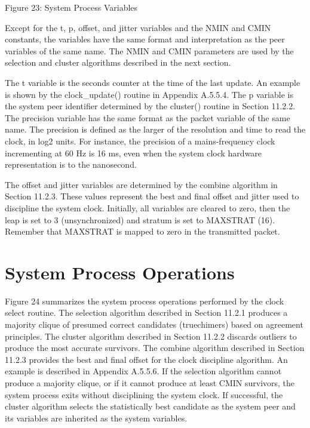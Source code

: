                 Figure 23: System Process Variables

Except for the t, p, offset, and jitter variables and the NMIN and
CMIN constants, the variables have the same format and interpretation
as the peer variables of the same name.  The NMIN and CMIN parameters
are used by the selection and cluster algorithms described in the
next section.

The t variable is the seconds counter at the time of the last update.
An example is shown by the clock_update() routine in
Appendix A.5.5.4.  The p variable is the system peer identifier
determined by the cluster() routine in Section 11.2.2.  The precision
variable has the same format as the packet variable of the same name.
The precision is defined as the larger of the resolution and time to
read the clock, in log2 units.  For instance, the precision of a
mains-frequency clock incrementing at 60 Hz is 16 ms, even when the
system clock hardware representation is to the nanosecond.

The offset and jitter variables are determined by the combine
algorithm in Section 11.2.3.  These values represent the best and
final offset and jitter used to discipline the system clock.
Initially, all variables are cleared to zero, then the leap is set to
3 (unsynchronized) and stratum is set to MAXSTRAT (16).  Remember
that MAXSTRAT is mapped to zero in the transmitted packet.

\section{System Process Operations}

Figure 24 summarizes the system process operations performed by the
clock select routine.  The selection algorithm described in
Section 11.2.1 produces a majority clique of presumed correct
candidates (truechimers) based on agreement principles.  The cluster
algorithm described in Section 11.2.2 discards outliers to produce
the most accurate survivors.  The combine algorithm described in
Section 11.2.3 provides the best and final offset for the clock
discipline algorithm.  An example is described in Appendix A.5.5.6.
If the selection algorithm cannot produce a majority clique, or if it
cannot produce at least CMIN survivors, the system process exits
without disciplining the system clock.  If successful, the cluster
algorithm selects the statistically best candidate as the system peer
and its variables are inherited as the system variables.


